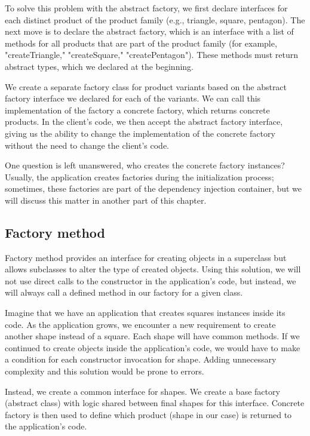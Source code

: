 To solve this problem with the abstract factory, we first declare interfaces for each distinct product of
the product family (e.g., triangle, square, pentagon). The next move is to declare the abstract factory, which is an interface with
a list of methods for all products that are part of the product family (for example, "createTriangle," "createSquare," "createPentagon").
These methods must return abstract types, which we declared at the beginning.

We create a separate factory class for product variants based on the abstract factory interface we declared for each of the variants.
We can call this implementation of the factory a concrete factory, which returns concrete products. In the client's code, we then accept the abstract
factory interface, giving us the ability to change the implementation of the concrete factory without the need to change the client's code.

One question is left unanswered, who creates the concrete factory instances? Usually, the application creates factories during
the initialization process; sometimes, these factories are part of the dependency injection container, but we will discuss this matter in another part of this chapter.

\subsection{Factory method}

Factory method provides an interface for creating objects in a superclass but allows subclasses to alter the type of created objects.
\cite{noauthor_factory_nodate} Using this solution, we will not use direct calls to the constructor in the application's code, but instead,
we will always call a defined method in our factory for a given class.

Imagine that we have an application that creates squares instances inside its code. As the application grows,
we encounter a new requirement to create another shape instead of a square. Each shape will have common methods.
If we continued to create objects inside the application's code, we would have to make a condition for each constructor invocation for shape.
Adding unnecessary complexity and this solution would be prone to errors.

Instead, we create a common interface for shapes. We create a base factory (abstract class) with logic shared between final shapes for this interface.
Concrete factory is then used to define which product (shape in our case) is returned to the application's code.

